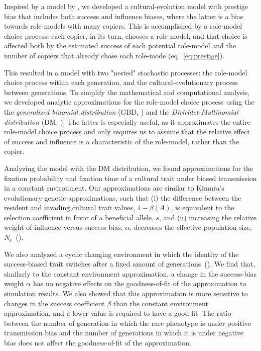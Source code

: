 \documentclass[12pt]{extarticle}
\begin{document}
Inspired by a model by \citet{evolutionBook}, we developed a cultural-evolution model with prestige bias that includes both success and influence biases, where the latter is a bias towards role-models with many copiers. This is accomplished by a role-model choice process: each copier, in its turn, chooses a role-model, and that choice is affected both by the estimated success of each potential role-model and the number of copiers that already chose each role-mode (eq.~\ref{eq:prestige}). 

This resulted in a model with two "nested" stochastic processes: the role-model choice process within each generation, and the cultural-evolutionary process between generations. To simplify the mathematical and computational analysis, we developed analytic approximations for the role-model choice process using the the {\em generalized binomial distribution} (GBD, ) and the {\em Dirichlet-Multinomial distribution} (DM, ).
The latter is especially useful, as it approximates the entire role-model choice process and only requires us to assume that the relative effect of success and influence is a characteristic of the role-model, rather than the copier.

Analyzing the model with the DM distribution, we found approximations for the fixation probability and fixation time of a cultural trait under biased transmission in a constant environment.
Our approximations are similar to Kimura's evolutionary-genetic approximations, such that (i) the difference between the resident and invading cultural trait values, $1-\beta(A)$, is equivalent to the selection coefficient in favor of a beneficial allele, $s$, and (ii) increasing the relative weight of influence versus success bias, $\alpha$, decreases the effective population size, $N_e$~().

We also analyzed a cyclic changing environment in which the identity of the success-biased trait switches after a fixed amount of generations~().
We find that, similarly to the constant environment approximation, a change in the success-bias weight $\alpha$ has no negative effects on the goodness-of-fit of the approximation to simulation results.
We also showed that this approximation is more sensitive to changes in the success coefficient $\beta$ than the constant environment approximation, and a lower value is required to have a good fit. The ratio between the number of generation in which the rare phenotype is under positive transmission bias and the number of generations in which it is under negative bias does not affect the goodness-of-fit of the approximation. 
\end{document}
